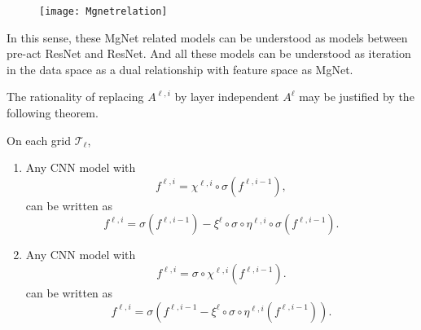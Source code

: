 \vspace{-19pt}
\begin{figure}[H]
	\begin{center}
		\texttt{[image: Mgnetrelation]} 
	\end{center}
	\label{fig:mgnet}
\end{figure}
\vspace{-26pt}
In this sense, these MgNet related models can be understood as
 models between pre-act ResNet and ResNet. And all these models can be
 understood as iteration in the data space as a dual relationship with
 feature space as MgNet.
 
 
The rationality of replacing  $A^{\ell,i}$ by layer independent $A^{\ell}$ may
be justified by the following theorem. 
\begin{theorem}\label{thm:CNN}
On each grid $\mathcal T_\ell$, 
\begin{enumerate}
	\item Any CNN model with
	\begin{equation}
	\label{CNN1}
	f^{\ell,i} =   \chi^{\ell,i} \circ \sigma (f^{\ell,i-1}),
	\end{equation} 
	can be written as
	\begin{equation}\label{Res-CNN1}
	f^{\ell,i} = \sigma(f^{\ell,i-1}) - \xi^{\ell} \circ \sigma \circ \eta^{\ell,i} \circ\sigma ( f^{\ell,i-1}).
	\end{equation}
	\item Any CNN model with 
	\begin{equation}
	\label{CNN2}
	f^{\ell,i} =   \sigma\circ\chi^{\ell,i} (f^{\ell,i-1}).
	\end{equation}
	can be written as 
	\begin{equation}\label{Res-CNN2}
	f^{\ell,i} = \sigma\left(f^{\ell,i-1} - \xi^{\ell} \circ \sigma \circ \eta^{\ell,i}  ( f^{\ell,i-1})\right).
	\end{equation}
\end{enumerate}

\end{theorem}
